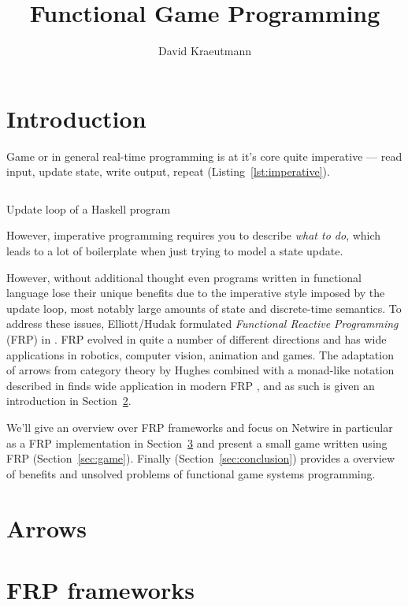 \documentclass{article}
\title{Functional Game Programming}
\author{David Kraeutmann}
\begin{document}
\maketitle

\section{Introduction}
Game or in general real-time programming is at it's core quite imperative --- read input, update state, write output, repeat (Listing~\ref{lst:imperative}). 
\begin{listing}[ht]
\label{lst:imperative}
\inputminted{haskell}{../kurzvortrag/Loop.hs}
\caption{Update loop of a Haskell program}
\end{listing}
However, imperative programming requires you to describe \emph{what to do}, which leads to a lot of boilerplate when just trying to model a state update.

However, without additional thought even programs written in functional language lose their unique benefits due to the imperative style imposed by the update loop, most notably large amounts of state and discrete-time semantics. To address these issues, Elliott/Hudak formulated \emph{Functional Reactive Programming} (FRP) in \cite{ElliottHudak97:Fran}. FRP evolved in quite a number of different directions and has wide applications in robotics, computer vision, animation and games. 
The adaptation of arrows from category theory by Hughes \cite{Hughes98generalisingmonads,PatersonRA:fop} combined with a monad-like notation described in \cite{PatersonRA:notation} finds wide application in modern FRP %
, and as such is given an introduction in Section~\ref{sec:arrows}.

We'll give an overview over FRP frameworks and focus on Netwire in particular as a FRP implementation in Section~\ref{sec:frameworks} and present a small game written using FRP (Section~\ref{sec:game}). Finally (Section~\ref{sec:conclusion}) provides a overview of benefits and unsolved problems of functional game systems programming.

\section{Arrows}
\label{sec:arrows}

\section{FRP frameworks}
\label{sec:frameworks}
\end{document}
